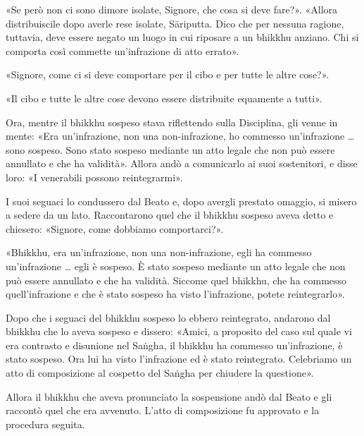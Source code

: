 «Se però non ci sono dimore isolate, Signore, che cosa si deve fare?». «Allora
distribuiscile dopo averle rese isolate, Sāriputta. Dico che per nessuna
ragione, tuttavia, deve essere negato un luogo in cui riposare a un bhikkhu
anziano. Chi si comporta così commette un’infrazione di atto errato».

«Signore, come ci si deve comportare per il cibo e per tutte le altre cose?».

«Il cibo e tutte le altre cose devono essere distribuite equamente a tutti».

Ora, mentre il bhikkhu sospeso stava riflettendo sulla Disciplina, gli venne in
mente: «Era un’infrazione, non una non-infrazione, ho commesso un’infrazione …
sono sospeso. Sono stato sospeso mediante un atto legale che non può essere
annullato e che ha validità». Allora andò a comunicarlo ai suoi sostenitori, e
disse loro: «I venerabili possono reintegrarmi».

I suoi seguaci lo condussero dal Beato e, dopo avergli prestato omaggio, si
misero a sedere da un lato. Raccontarono quel che il bhikkhu sospeso aveva detto
e chiesero: «Signore, come dobbiamo comportarci?».

«Bhikkhu, era un’infrazione, non una non-infrazione, egli ha commesso
un’infrazione … egli è sospeso. È stato sospeso mediante un atto legale che non
può essere annullato e che ha validità. Siccome quel bhikkhu, che ha commesso
quell’infrazione e che è stato sospeso ha visto l’infrazione, potete
reintegrarlo».

Dopo che i seguaci del bhikkhu sospeso lo ebbero reintegrato, andarono dal
bhikkhu che lo aveva sospeso e dissero: «Amici, a proposito del caso sul quale
vi era contrasto e disunione nel Saṅgha, il bhikkhu ha commesso un’infrazione, è
stato sospeso. Ora lui ha visto l’infrazione ed è stato reintegrato. Celebriamo
un atto di composizione al cospetto del Saṅgha per chiudere la questione».

Allora il bhikkhu che aveva pronunciato la sospensione andò dal Beato e gli
raccontò quel che era avvenuto. L’atto di composizione fu approvato e la
procedura seguita.


